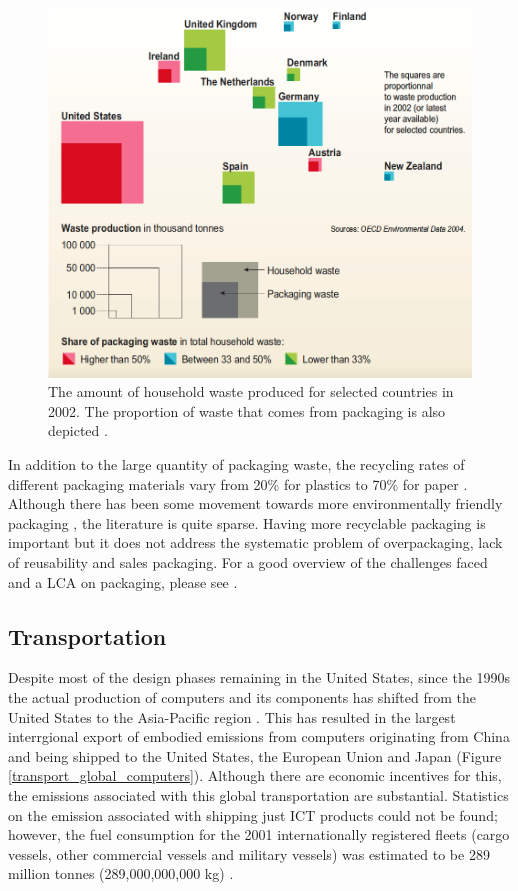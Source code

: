 \documentclass{article}
\begin{document}
\begin{figure}[h]
    \includegraphics[width=.85 \textwidth]{./images/packaging_waste.png}
    \centering
    \caption{The amount of household waste produced for selected countries in 2002. The proportion of waste that comes from packaging is also depicted \cite{bournay2006vital}.}
    \label{packaging_waste}
\end{figure}

In addition to the large quantity of packaging waste, the recycling rates of different packaging materials vary from 20\% for plastics to 70\% for paper \cite{bournay2006vital}. Although there has been some movement towards more environmentally friendly packaging \cite{min1997green, cinelli2019cosmetic, chiellini2008environmentally, moustafa2019eco}, the literature is quite sparse. Having more recyclable packaging is important but it does not address the systematic problem of overpackaging, lack of reusability and sales packaging. For a good overview of the challenges faced and a LCA on packaging, please see \cite{lee2005design}.


\subsection{Transportation}
Despite most of the design phases remaining in the United States, since the 1990s the actual production of computers and its components has shifted from the United States to the Asia-Pacific region \cite{kraemer1998globalization}. This has resulted in the largest interrgional export of embodied emissions from computers originating from China and being shipped to the United States, the European Union and Japan (Figure \ref{transport_global_computers}). Although there are economic incentives for this, the emissions associated with this global transportation are substantial. 
Statistics on the emission associated with shipping just ICT products could not be found; however, the fuel consumption for the 2001 internationally registered fleets (cargo vessels, other commercial vessels and military vessels) was estimated to be 289 million tonnes (289,000,000,000 kg) \cite{corbett2003updated}.
\end{document}

